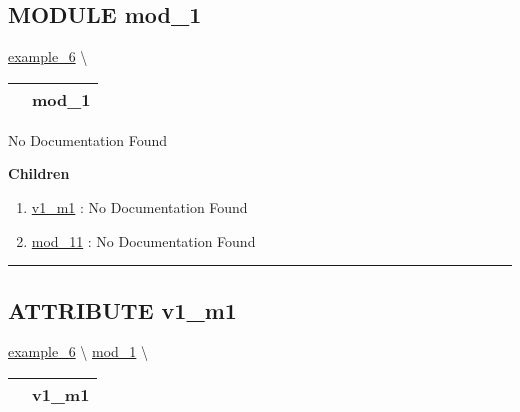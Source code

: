\subsection*{\textsf{\colorbox{headtoc}{\color{white} MODULE}
mod\_1}}

\hypertarget{ecldoc:example_6.mod_1}{}
\hspace{0pt} \hyperlink{ecldoc:example_6}{example_6} \textbackslash 

{\renewcommand{\arraystretch}{1.5}
\begin{tabularx}{\textwidth}{|>{\raggedright\arraybackslash}l|X|}
\hline
\hspace{0pt}\mytexttt{\color{red} } & \textbf{mod\_1} \\
\hline
\end{tabularx}
}

\par





No Documentation Found







\textbf{Children}
\begin{enumerate}
\item \hyperlink{ecldoc:example_6.mod_1.v1_m1}{v1\_m1}
: No Documentation Found
\item \hyperlink{ecldoc:example_6.mod_1.mod_11}{mod\_11}
: No Documentation Found
\end{enumerate}

\rule{\linewidth}{0.5pt}

\subsection*{\textsf{\colorbox{headtoc}{\color{white} ATTRIBUTE}
v1\_m1}}

\hypertarget{ecldoc:example_6.mod_1.v1_m1}{}
\hspace{0pt} \hyperlink{ecldoc:example_6}{example_6} \textbackslash 
\hspace{0pt} \hyperlink{ecldoc:example_6.mod_1}{mod_1} \textbackslash 

{\renewcommand{\arraystretch}{1.5}
\begin{tabularx}{\textwidth}{|>{\raggedright\arraybackslash}l|X|}
\hline
\hspace{0pt}\mytexttt{\color{red} } & \textbf{v1\_m1} \\
\hline
\end{tabularx}
}

